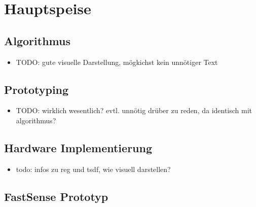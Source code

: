 \documentclass{beamer}
\begin{document}
\section{Hauptspeise}
\begin{frame}{}
\begin{center}
\end{center}
\end{frame}

\subsection{Algorithmus}
\begin{frame}{\subsecname}
\begin{itemize}
\item{TODO: gute visuelle Darstellung, mögkichst kein unnötiger Text}
\end{itemize}
\end{frame}

\subsection{Prototyping}
\begin{frame}{\subsecname}
\begin{itemize}
\item{TODO: wirklich wesentlich? evtl. unnötig drüber zu reden, da identisch mit algorithmus?}
\end{itemize}
\end{frame}

\subsection{Hardware Implementierung}
\begin{frame}{\subsecname}
\begin{itemize}
\item{todo: infos zu reg und tsdf, wie visuell darstellen?}
\end{itemize}
\end{frame}

\subsection{FastSense Prototyp}
\begin{frame}{\subsecname}
\begin{center}
\end{center}
\end{frame}
\end{document}
